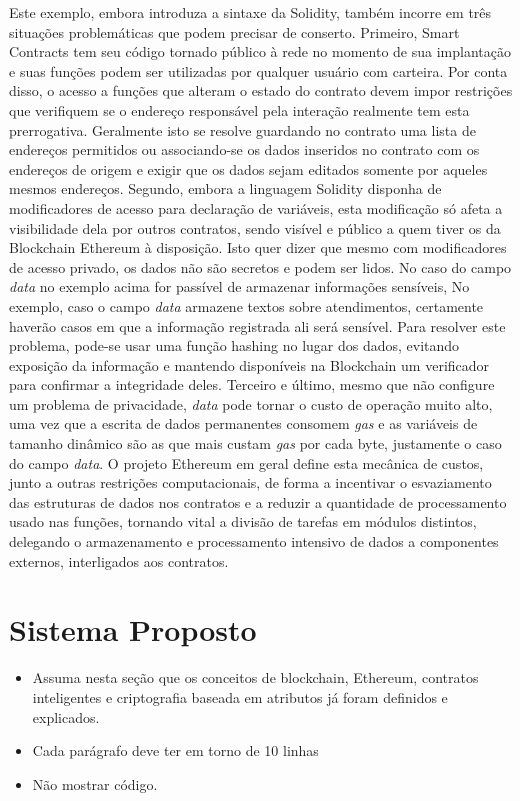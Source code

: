 \documentclass[a4paper,11pt]{article}
\begin{document}
Este exemplo, embora introduza a sintaxe da Solidity, também incorre em três situações problemáticas que podem precisar de conserto.
Primeiro, Smart Contracts tem seu código tornado público à rede no momento de sua implantação e suas funções podem ser utilizadas por qualquer usuário com carteira.
Por conta disso, o acesso a funções que alteram o estado do contrato devem impor restrições que verifiquem se o endereço responsável pela interação realmente tem esta prerrogativa.
Geralmente isto se resolve guardando no contrato uma lista de endereços permitidos ou associando-se os dados inseridos no contrato com os endereços de origem e exigir que os dados sejam editados somente por aqueles mesmos endereços.
Segundo, embora a linguagem Solidity disponha de modificadores de acesso para declaração de variáveis, esta modificação só afeta a visibilidade dela por outros contratos, sendo visível e público a quem tiver os da Blockchain Ethereum à disposição.
Isto quer dizer que mesmo com modificadores de acesso privado, os dados não são secretos e podem ser lidos.
No caso do campo \emph{data} no exemplo acima for passível de armazenar informações sensíveis,
No exemplo, caso o campo \emph{data} armazene textos sobre atendimentos, certamente haverão casos em que a informação registrada ali será sensível.
Para resolver este problema, pode-se usar uma função hashing no lugar dos dados, evitando exposição da informação e mantendo disponíveis na Blockchain um verificador para confirmar a integridade deles.
Terceiro e último, mesmo que não configure um problema de privacidade, \emph{data} pode tornar o custo de operação muito alto, uma vez que a escrita de dados permanentes consomem \emph{gas} e as variáveis de tamanho dinâmico são as que mais custam \emph{gas} por cada byte, justamente o caso do campo \emph{data}.
O projeto Ethereum em geral define esta mecânica de custos, junto a outras restrições computacionais, de forma a incentivar o esvaziamento das estruturas de dados nos contratos e a reduzir a quantidade de processamento usado nas funções, tornando vital a divisão de tarefas em módulos distintos, delegando o armazenamento e processamento intensivo de dados a componentes externos, interligados aos contratos.

\newpage
\section{Sistema Proposto}

\begin{itemize}
    \item {\color{red} Assuma nesta seção que os conceitos de blockchain, Ethereum, contratos inteligentes e criptografia baseada em atributos já foram definidos e explicados.}

    \item {\color{red}Cada parágrafo deve ter em torno de 10 linhas}

    \item {\color{red}Não mostrar código.}

\end{itemize}
\end{document}
